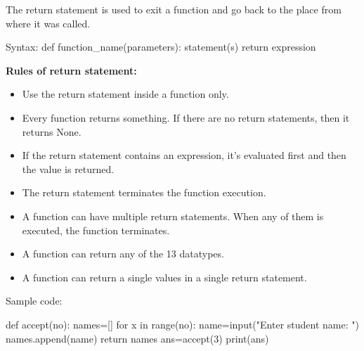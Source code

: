 \setlength{\columnsep}{3pt}
\begin{flushleft}
	
	The return statement is used to exit a function and go back to the place from
	where it was called.
	
	\begin{tcolorbox}[breakable,notitle,boxrule=1pt,colback=pink,colframe=pink]
		\color{black}
		\font=8pt
		Syntax: 
		\newline
		def function\_name(parameters):
		\newline
		\hphantom{} \hphantom{} statement(s) \newline
		\hphantom{} \hphantom{} return expression
		\font=4pt
	\end{tcolorbox}			
	
	\textbf{Rules of return statement:}
	\begin{itemize}
		\item Use the return statement inside a function only.
		\item Every function returns something. If there are no return statements, then it returns None.
		\item If the return statement contains an expression, it’s evaluated first and then the value is returned.
		\item The return statement terminates the function execution.
		\item A function can have multiple return statements. When any of them is executed, the function terminates.
		\item A function can return any of the 13 datatypes.
		\item A function can return a single values in a single return statement.
	\end{itemize}
	
	\newpage
	
	Sample code:
	\begin{tcolorbox}[breakable,notitle,boxrule=-0pt,colback=black,colframe=black]
		\color{green}
		\font=9pt
		def accept(no): \newline
		\hphantom{} \hphantom{} names=[] \newline
		\hphantom{} \hphantom{} for x in range(no): \newline
		\hphantom{} \hphantom{} \hphantom{} \hphantom{} name=input("Enter student name: ") \newline
		\hphantom{} \hphantom{} \hphantom{} \hphantom{} names.append(name) \newline
		return names \newline
		\newline
		ans=accept(3) \newline
		print(ans)
		\font=4pt
	\end{tcolorbox}
	

\end{flushleft}
